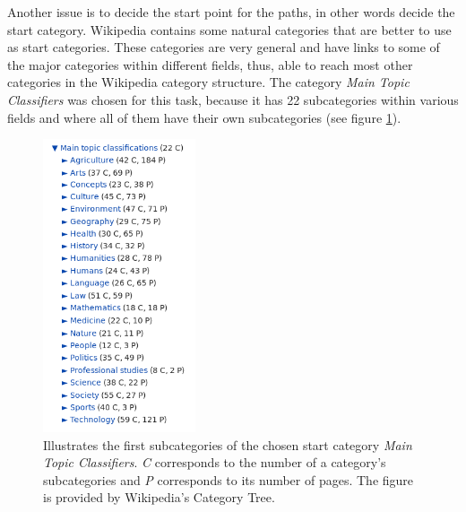 Another issue is to decide the start point for the paths, in other words decide the start category. Wikipedia contains some natural categories that are better to use as start categories. These categories are very general and have links to some of the major categories within different fields, thus, able to reach most other categories in the Wikipedia category structure. The category \emph{Main Topic Classifiers} was chosen for this task, because it has 22 subcategories within various fields and  where all of them have their own subcategories (see figure \ref{fig:mainclassifiers})\cite{wiki:specialtree}.

\begin{figure}[h]
\begin{center}
\includegraphics[width=0.4\textwidth]{Chapters/Implementation/Maintopicclassifiers.png}
\end{center}
\caption[Subcategories of \emph{Main Topic Classifiers}]{Illustrates the first subcategories of the chosen start category \emph{Main Topic Classifiers}. \emph{C} corresponds to the number of a category's subcategories and \emph{P} corresponds to its number of pages. The figure is provided by Wikipedia's Category Tree.} %
\vspace{-20pt}
\label{fig:mainclassifiers}
\end{figure}


